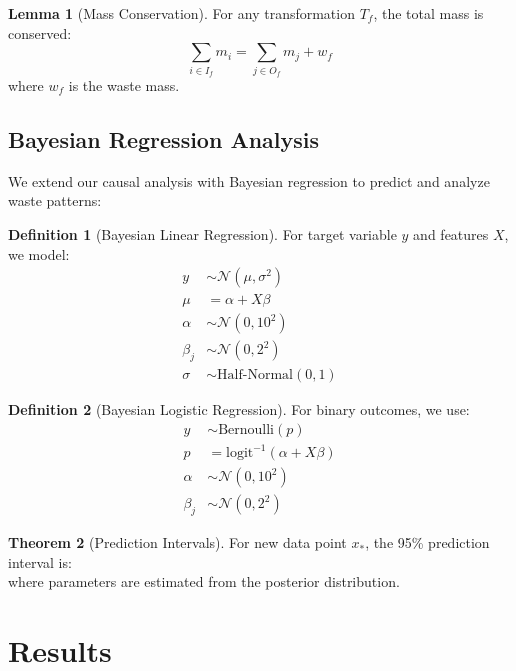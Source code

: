 \documentclass[12pt]{article}
\theoremstyle{definition}
\newtheorem{definition}{Definition}
\newtheorem{theorem}{Theorem}
\newtheorem{lemma}[theorem]{Lemma}
\begin{document}
\begin{lemma}[Mass Conservation]
For any transformation $T_f$, the total mass is conserved:
\begin{equation}
    \sum_{i \in I_f} m_i = \sum_{j \in O_f} m_j + w_f
\end{equation}
where $w_f$ is the waste mass.
\end{lemma}

\subsection{Bayesian Regression Analysis}
We extend our causal analysis with Bayesian regression to predict and analyze waste patterns:

\begin{definition}[Bayesian Linear Regression]
For target variable $y$ and features $X$, we model:
\begin{align*}
    y &\sim \mathcal{N}(\mu, \sigma^2) \\
    \mu &= \alpha + X\beta \\
    \alpha &\sim \mathcal{N}(0, 10^2) \\
    \beta_j &\sim \mathcal{N}(0, 2^2) \\
    \sigma &\sim \text{Half-Normal}(0, 1)
\end{align*}
\end{definition}

\begin{definition}[Bayesian Logistic Regression]
For binary outcomes, we use:
\begin{align*}
    y &\sim \text{Bernoulli}(p) \\
    p &= \text{logit}^{-1}(\alpha + X\beta) \\
    \alpha &\sim \mathcal{N}(0, 10^2) \\
    \beta_j &\sim \mathcal{N}(0, 2^2)
\end{align*}
\end{definition}

\begin{theorem}[Prediction Intervals]
For new data point $x_*$, the 95\% prediction interval is:
\begin{equation}
    [\hat{y}_* \pm 1.96 \sqrt{\text{Var}(\alpha) + x_*^T \text{Cov}(\beta) x_* + \sigma^2}]
\end{equation}
where parameters are estimated from the posterior distribution.
\end{theorem}

\section{Results}
\end{document}
